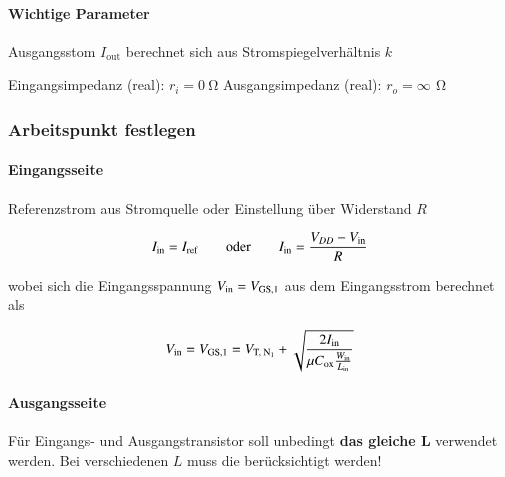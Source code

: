 \paragraph{Wichtige Parameter}  %

\begin{minipage}[t]{0.48\columnwidth}
    \begin{outline}
        \1 Ausgangsstom $I_\text{out}$ berechnet sich aus Stromspiegelverhältnis $k$
    \end{outline}
\end{minipage}
\hfill
\begin{minipage}[t]{0.48\columnwidth}
    \begin{outline}
        \1 Eingangsimpedanz (real): $r_i = \qty{0}{\ohm}$
        \1 Ausgangsimpedanz (real): $r_o = \infty \, \qty{}{\ohm}$
    \end{outline}
\end{minipage}



\subsubsection{Arbeitspunkt festlegen}

\paragraph{Eingangsseite}

Referenzstrom aus Stromquelle oder Einstellung über Widerstand $R$

\vspace{-0.2cm}

\[
    I_\text{in} = I_\text{ref} \qquad \text{oder} \qquad I_\text{in} = \frac{V_{DD} - V_{\rm in}}{R}
\]

wobei sich die Eingangsspannung $V_{\rm in} = V_{\rm GS,1}$ aus dem Eingangsstrom berechnet als

\vspace{-0.2cm}

\[
    V_\text{in} = V_{\rm GS,1} = V_{\text{T, N}_1} + \sqrt{\frac{2 I_\text{in}}{\mu C_\text{ox}\frac{W_{\rm in}}{L_{\rm in}}}}
\]



\paragraph{Ausgangsseite}

Für Eingangs- und Ausgangstransistor soll unbedingt \textbf{das gleiche $\bm{L}$} verwendet werden.
Bei verschiedenen $L$ muss die  berücksichtigt werden!

